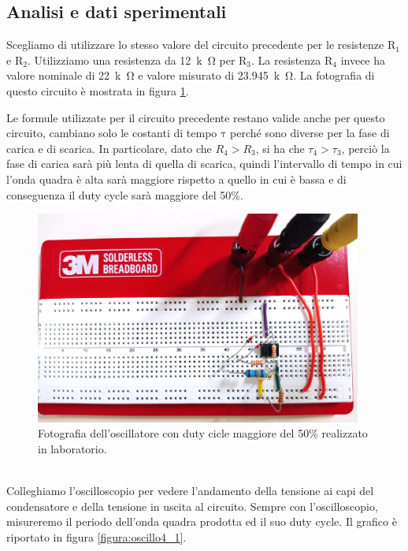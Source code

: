 \documentclass{report}
\begin{document}
\subsection{Analisi e dati sperimentali}
Scegliamo di utilizzare lo stesso valore del circuito precedente per le resistenze $\mathrm{R_1}$ e $\mathrm{R_2}$. Utilizziamo una resistenza da \SI{12}{k\ohm} per $\mathrm{R_3}$. La resistenza $\mathrm{R_4}$ invece ha valore nominale di \SI{22}{k\ohm} e valore misurato di \SI{23.945}{k\ohm}. La fotografia di questo circuito è mostrata in figura \ref{figura:circuito4_1}.\par
Le formule utilizzate per il circuito precedente restano valide anche per questo circuito, cambiano solo le costanti di tempo $\mathrm{\tau}$ perché sono diverse per la fase di carica e di scarica. In particolare, dato che $\displaystyle{R_4>R_3}$, si ha che $\displaystyle{\tau_4>\tau_3}$, perciò la fase di carica sarà più lenta di quella di scarica, quindi l'intervallo di tempo in cui l'onda quadra è alta sarà maggiore rispetto a quello in cui è bassa e di conseguenza il duty cycle sarà maggiore del 50\%.
\begin{figure}[h!]
	\centering
	\includegraphics[height=7cm]{immagini/circuito4_1.jpg}
	\caption{Fotografia dell'oscillatore con duty cicle maggiore del 50\% realizzato in laboratorio.}
	\label{figura:circuito4_1}
\end{figure}
\\Colleghiamo l'oscilloscopio per vedere l'andamento della tensione ai capi del condensatore e della tensione in uscita al circuito. Sempre con l'oscilloscopio, misureremo il periodo dell'onda quadra prodotta ed il suo duty cycle. Il grafico è riportato in figura \ref{figura:oscillo4_1}.\par
\end{document}
